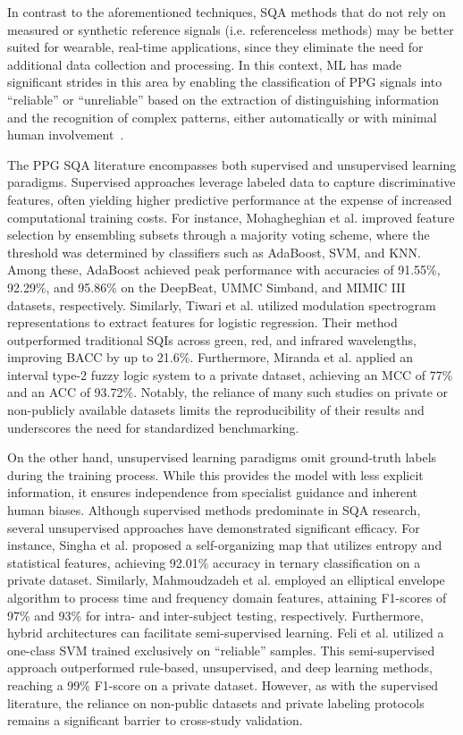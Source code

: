 \documentclass[final,3p,times,twocolumn]{elsarticle}
\begin{document}
In contrast to the aforementioned techniques, \gls{SQA} methods that do not rely on measured or synthetic reference signals (i.e. referenceless methods) may be better suited for wearable, real-time applications, since they eliminate the need for additional data collection and processing.
In this context, \gls{ML} has made significant strides in this area by enabling the classification of \gls{PPG} signals into ``reliable'' or ``unreliable'' based on the extraction of distinguishing information and the recognition of complex patterns, either automatically or with minimal human involvement~\cite{janiesch2021machine}. 


The \gls{PPG} \gls{SQA} literature encompasses both supervised and unsupervised learning paradigms.
Supervised approaches leverage labeled data to capture discriminative features, often yielding higher predictive performance at the expense of increased computational training costs.
For instance, Mohagheghian et al. \cite{ppg-sqa-1} improved feature selection by ensembling subsets through a majority voting scheme, where the threshold was determined by classifiers such as AdaBoost, \gls{SVM}, and \gls{KNN}.
Among these, AdaBoost achieved peak performance with accuracies of 91.55\%, 92.29\%, and 95.86\% on the DeepBeat, UMMC Simband, and MIMIC III datasets, respectively. Similarly, Tiwari et al. \cite{ppg-sqa-2} utilized modulation spectrogram representations to extract features for logistic regression.
Their method outperformed traditional \glspl{SQI} across green, red, and infrared wavelengths, improving \gls{BACC} by up to 21.6\%.
Furthermore, Miranda et al. \cite{ppg-sqa-3} applied an interval type-2 fuzzy logic system to a private dataset, achieving an \gls{MCC} of 77\% and an \gls{ACC} of 93.72\%.
Notably, the reliance of many such studies on private or non-publicly available datasets limits the reproducibility of their results and underscores the need for standardized benchmarking.


On the other hand, unsupervised learning paradigms omit ground-truth labels during the training process.
While this provides the model with less explicit information, it ensures independence from specialist guidance and inherent human biases. 
Although supervised methods predominate in \gls{SQA} research, several unsupervised approaches have demonstrated significant efficacy.
For instance, Singha et al. \cite{ppg-sqa-4} proposed a self-organizing map that utilizes entropy and statistical features, achieving 92.01\% accuracy in ternary classification on a private dataset.
Similarly, Mahmoudzadeh et al. \cite{ppg-sqa-5} employed an elliptical envelope algorithm to process time and frequency domain features, attaining F1-scores of 97\% and 93\% for intra- and inter-subject testing, respectively.
Furthermore, hybrid architectures can facilitate semi-supervised learning.
Feli et al. \cite{ppg-sqa-6} utilized a one-class \gls{SVM} trained exclusively on ``reliable'' samples.
This semi-supervised approach outperformed rule-based, unsupervised, and deep learning methods, reaching a 99\% F1-score on a private dataset.
However, as with the supervised literature, the reliance on non-public datasets and private labeling protocols remains a significant barrier to cross-study validation.
\end{document}
